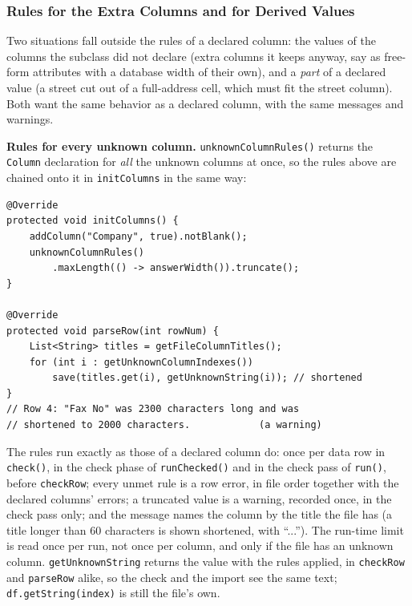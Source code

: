 \subsubsection*{Rules for the Extra Columns and for Derived Values}
\label{sec:file-csv-unknown-rules}

Two situations fall outside the rules of a declared column: the values of the columns the subclass did not declare (extra columns it keeps anyway, say as free-form attributes with a database width of their own), and a \emph{part} of a declared value (a street cut out of a full-address cell, which must fit the street column).  Both want the same behavior as a declared column, with the same messages and warnings.

\textbf{Rules for every unknown column.}  \texttt{unknownColumnRules()} returns the \texttt{Column} declaration for \emph{all} the unknown columns at once, so the rules above are chained onto it in \texttt{initColumns} in the same way:

\begin{lstlisting}[style=java]
@Override
protected void initColumns() {
    addColumn("Company", true).notBlank();
    unknownColumnRules()
        .maxLength(() -> answerWidth()).truncate();
}

@Override
protected void parseRow(int rowNum) {
    List<String> titles = getFileColumnTitles();
    for (int i : getUnknownColumnIndexes())
        save(titles.get(i), getUnknownString(i)); // shortened
}
// Row 4: "Fax No" was 2300 characters long and was
// shortened to 2000 characters.            (a warning)
\end{lstlisting}

The rules run exactly as those of a declared column do: once per data row in \texttt{check()}, in the check phase of \texttt{runChecked()} and in the check pass of \texttt{run()}, before \texttt{checkRow}; every unmet rule is a row error, in file order together with the declared columns' errors; a truncated value is a warning, recorded once, in the check pass only; and the message names the column by the title the file has (a title longer than 60 characters is shown shortened, with ``...'').  The run-time limit is read once per run, not once per column, and only if the file has an unknown column.  \texttt{getUnknownString} returns the value with the rules applied, in \texttt{checkRow} and \texttt{parseRow} alike, so the check and the import see the same text; \texttt{df.getString(index)} is still the file's own.

